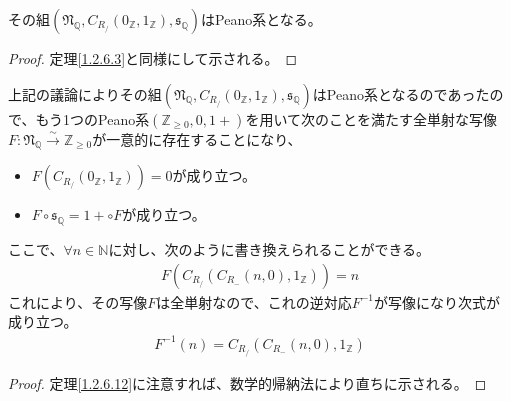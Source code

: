 \documentclass[dvipdfmx]{jsarticle}
\begin{document}
\begin{thm}\label{1.2.6.12}
その組$\left( \mathfrak{N}_{\mathbb{Q}},C_{R_{/}}\left( 0_{\mathbb{Z}},1_{\mathbb{Z}} \right),\mathfrak{s}_{\mathbb{Q}} \right)$はPeano系となる。
\end{thm}
\begin{proof}
定理\ref{1.2.6.3}と同様にして示される。
\end{proof}
\begin{thm}\label{1.2.6.13}
上記の議論によりその組$\left( \mathfrak{N}_{\mathbb{Q}},C_{R_{/}}\left( 0_{\mathbb{Z}},1_{\mathbb{Z}} \right),\mathfrak{s}_{\mathbb{Q}} \right)$はPeano系となるのであったので、もう1つのPeano系$\left( \mathbb{Z}_{\geq 0},0,1 + \right)$を用いて次のことを満たす全単射な写像$F:\mathfrak{N}_{\mathbb{Q}}\overset{\sim}{\rightarrow}\mathbb{Z}_{\geq 0}$が一意的に存在することになり、
\begin{itemize}
\item
  $F\left( C_{R_{/}}\left( 0_{\mathbb{Z}},1_{\mathbb{Z}} \right) \right) = 0$が成り立つ。
\item
  $F \circ \mathfrak{s}_{\mathbb{Q}} = 1 + \circ F$が成り立つ。
\end{itemize}
ここで、$\forall n \in \mathbb{N}$に対し、次のように書き換えられることができる。
\begin{align*}
F\left( C_{R_{/}}\left( C_{R_{-}}(n,0),1_{\mathbb{Z}} \right) \right) = n
\end{align*}
これにより、その写像$F$は全単射なので、これの逆対応$F^{- 1}$が写像になり次式が成り立つ。
\begin{align*}
F^{- 1}(n) = C_{R_{/}}\left( C_{R_{-}}(n,0),1_{\mathbb{Z}} \right)
\end{align*}
\end{thm}
\begin{proof}
定理\ref{1.2.6.12}に注意すれば、数学的帰納法により直ちに示される。
\end{proof}
\end{document}
